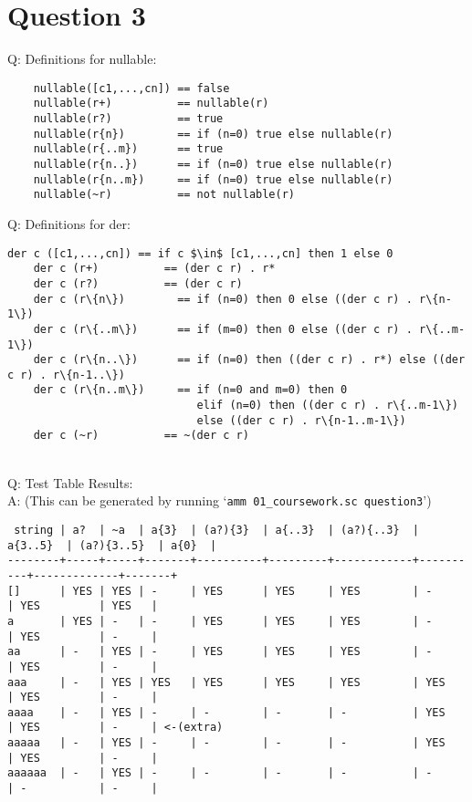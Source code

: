 \documentclass[english]{scrartcl}
\begin{document}
\section*{Question 3}
Q: Definitions for nullable:
\\
\begin{verbatim}
    nullable([c1,...,cn]) == false
    nullable(r+)          == nullable(r)
    nullable(r?)          == true
    nullable(r{n})        == if (n=0) true else nullable(r)
    nullable(r{..m})      == true
    nullable(r{n..})      == if (n=0) true else nullable(r)
    nullable(r{n..m})     == if (n=0) true else nullable(r)
    nullable(~r)          == not nullable(r)
\end{verbatim}


Q: Definitions for der:
\\
\begin{Verbatim}[mathescape,commandchars=\\\{\}]
    der c ([c1,...,cn]) == if c $\in$ [c1,...,cn] then 1 else 0
    der c (r+)          == (der c r) . r*
    der c (r?)          == (der c r)
    der c (r\{n\})        == if (n=0) then 0 else ((der c r) . r\{n-1\})
    der c (r\{..m\})      == if (m=0) then 0 else ((der c r) . r\{..m-1\})
    der c (r\{n..\})      == if (n=0) then ((der c r) . r*) else ((der c r) . r\{n-1..\})
    der c (r\{n..m\})     == if (n=0 and m=0) then 0
                             elif (n=0) then ((der c r) . r\{..m-1\})
                             else ((der c r) . r\{n-1..m-1\})
    der c (~r)          == ~(der c r)
\end{Verbatim}

\mbox{}\\

Q: Test Table Results: \\
A: (This can be generated by running `\verb|amm 01_coursework.sc question3|')
\footnotesize\begin{verbatim}
 string | a?  | ~a  | a{3}  | (a?){3}  | a{..3}  | (a?){..3}  | a{3..5}  | (a?){3..5}  | a{0}  |
--------+-----+-----+-------+----------+---------+------------+----------+-------------+-------+
[]      | YES | YES | -     | YES      | YES     | YES        | -        | YES         | YES   |
a       | YES | -   | -     | YES      | YES     | YES        | -        | YES         | -     |
aa      | -   | YES | -     | YES      | YES     | YES        | -        | YES         | -     |
aaa     | -   | YES | YES   | YES      | YES     | YES        | YES      | YES         | -     |
aaaa    | -   | YES | -     | -        | -       | -          | YES      | YES         | -     | <-(extra)
aaaaa   | -   | YES | -     | -        | -       | -          | YES      | YES         | -     |
aaaaaa  | -   | YES | -     | -        | -       | -          | -        | -           | -     |
\end{verbatim}
\normalsize
\end{document}
